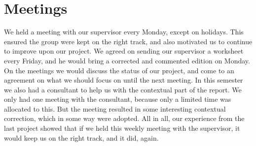 \section{Meetings}
We held a meeting with our supervisor every Monday, except on holidays. This ensured the group were kept on the right track, and also motivated us to continue to improve upon our project. We agreed on sending our supervisor a worksheet every Friday, and he would bring a corrected and commented edition on Monday. On the meetings we would discuss the status of our project, and come to an agreement on what we should focus on until the next meeting. In this semester we also had a consultant to help us with the contextual part of the report. We only had one meeting with the consultant, because only a limited time was allocated to this. But the meeting resulted in some interesting contextual correction, which in some way were adopted. All in all, our experience from the last project showed that if we held this weekly meeting with the supervisor, it would keep us on the right track, and it did, again. 